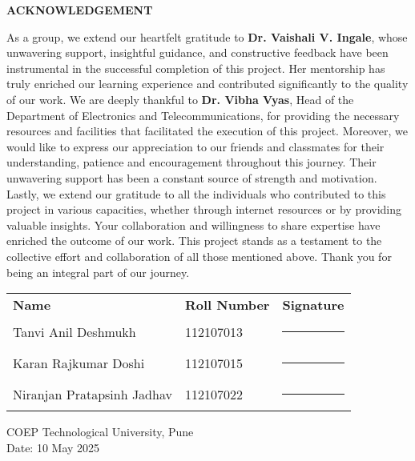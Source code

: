 \thispagestyle{empty}

\cleardoublepage        
\vspace*{1cm}  
{}
\begin{center}
 \Large {\bf \uppercase{Acknowledgement}}
\end{center}

\vspace{3\baselineskip}
\begin{justify}
\noindent
As a group, we extend our heartfelt gratitude to \textbf{Dr. Vaishali V. Ingale}, whose unwavering support, insightful guidance, and constructive feedback have been instrumental in the successful completion of this project. Her mentorship has truly enriched our learning experience and contributed significantly to the quality of our work. We are deeply thankful to \textbf{Dr. Vibha Vyas}, Head of the Department of Electronics and Telecommunications, for providing the necessary resources and facilities that facilitated the execution of this project. Moreover, we would like to express our appreciation to our friends and classmates for their understanding, patience and encouragement throughout this journey. Their unwavering support has been a constant source of strength and motivation. Lastly, we extend our gratitude to all the individuals who contributed to this project in various capacities, whether through internet resources or by providing valuable insights. Your collaboration and willingness to share expertise have enriched the outcome of our work. This project stands as a testament to the collective effort and collaboration of all those mentioned above. Thank you for being an integral part of our journey.
\end{justify}

\vspace{1.5\baselineskip}

\begin{center}
\begin{tabular}{lll}
\textbf{Name} & \textbf{Roll Number} & \textbf{Signature} \\[1em]
Tanvi Anil Deshmukh & 112107013 & \rule{4cm}{0.4pt} \\[1em]
Karan Rajkumar Doshi & 112107015 & \rule{4cm}{0.4pt} \\[1em]
Niranjan Pratapsinh Jadhav & 112107022 & \rule{4cm}{0.4pt} \\
\end{tabular}
\end{center}


\vspace{4\baselineskip}
\noindent
COEP Technological University, Pune \\
Date: 10 May 2025

